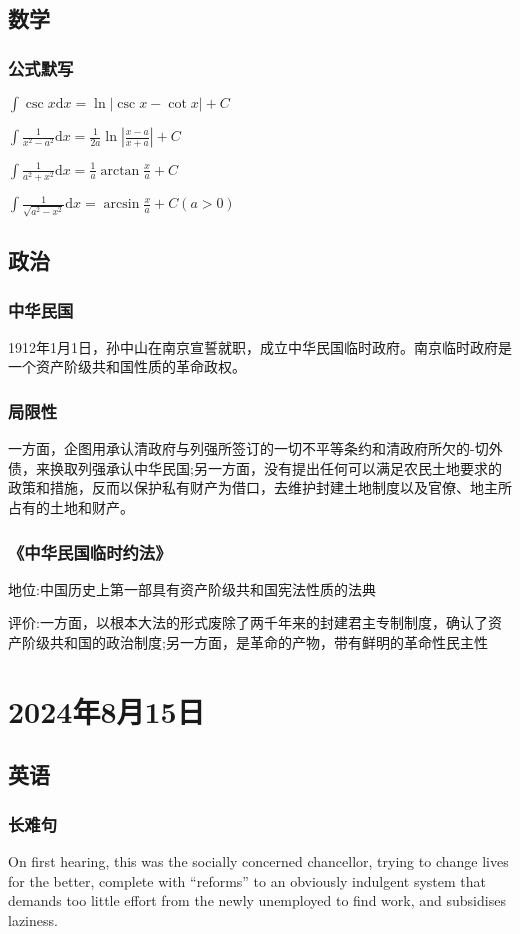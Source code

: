 \documentclass[UTF8]{ctexart}
\begin{document}
\subsection{数学}
\subsubsection{公式默写}
\begin{multicols}{2}
      $\int\csc x\mathrm{d}x=\ln|\csc x-\cot x|+C$

      $\int\frac{1}{x^2-a^2}\mathrm{d}x=\frac{1}{2a}\ln|\frac{x-a}{x+a}|+C$

      $\int\frac{1}{a^2+x^2}\mathrm{d}x=\frac{1}{a}\arctan\frac{x}{a}+C$

      $\int\frac{1}{\sqrt{a^2-x^2}}\mathrm{d}x=\arcsin\frac{x}{a}+C(a>0)$
\end{multicols}
\subsection{政治}
\subsubsection{中华民国}
1912年1月1日，孙中山在南京宣誓就职，成立中华民国临时政府。南京临时政府是一个资产阶级共和国性质的革命政权。
\subsubsection{局限性}
一方面，企图用承认清政府与列强所签订的一切不平等条约和清政府所欠的-切外债，来换取列强承认中华民国;另一方面，没有提出任何可以满足农民土地要求的政策和措施，反而以保护私有财产为借口，去维护封建土地制度以及官僚、地主所占有的土地和财产。
\subsubsection{《中华民国临时约法》}
地位:中国历史上第一部具有资产阶级共和国宪法性质的法典

评价:一方面，以根本大法的形式废除了两千年来的封建君主专制制度，确认了资产阶级共和国的政治制度;另一方面，是革命的产物，带有鲜明的革命性民主性
\section{2024年8月15日}
\subsection{英语}
\subsubsection{长难句}
On first hearing, this was the socially concerned chancellor, trying to change lives for the better, complete with ``reforms'' to an obviously indulgent system that demands too little effort from the newly unemployed to find work, and subsidises laziness.
\end{document}
